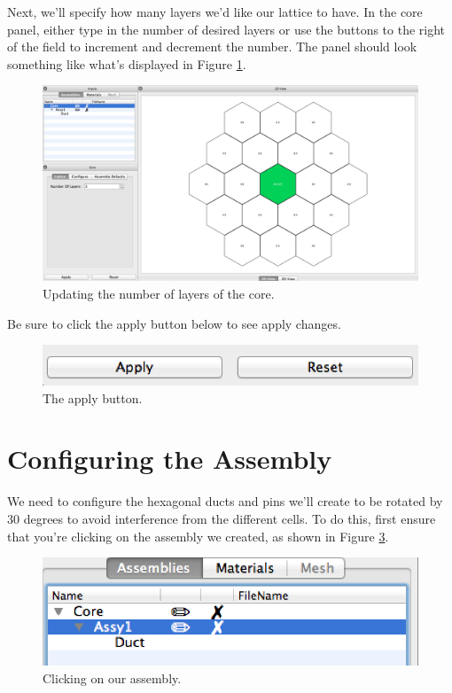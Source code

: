 Next, we'll specify how many layers we'd like our lattice to have.  In the core panel, either type in the number of desired layers or use the buttons to the right of the field to increment and decrement the number.  The panel should look something like what's displayed in Figure \ref{fig:Hex3}.

\begin{figure}[H]
	\begin{center}
		\includegraphics[width=0.5\linewidth]{Images/hex-increase-core-layers.png}
		\caption{Updating the number of layers of the core.}
		\label{fig:Hex3}
	\end{center}
\end{figure}

Be sure to click the apply button below to see apply changes.

\begin{figure}[H]
	\begin{center}
		\includegraphics[width=0.5\linewidth]{Images/hex-apply-button.png}
		\caption{The apply button.}
		\label{fig:Hex4}
	\end{center}
\end{figure}

\section{Configuring the Assembly}
\label{section:RotateAssembly30}
We need to configure the hexagonal ducts and pins we'll create to be rotated by 30 degrees to avoid interference from the different cells.  To do this, first ensure that you're clicking on the assembly we created, as shown in Figure \ref{fig:Hex15}.

\begin{figure}[H]
	\begin{center}
		\includegraphics[width=0.5\linewidth]{Images/hex-select-assy1.png}
		\caption{Clicking on our assembly.}
		\label{fig:Hex15}
	\end{center}
\end{figure}

